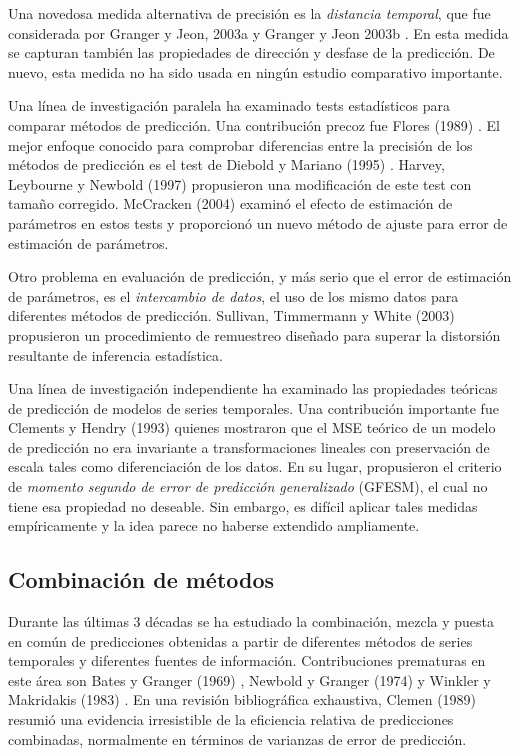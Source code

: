 \documentclass{llncs}
\begin{document}
Una novedosa medida alternativa de precisión es la \emph{distancia temporal}, que fue considerada por Granger y Jeon, 2003a \cite{Granger2003199} y Granger y Jeon 2003b \cite{Granger2003339}. En esta medida se capturan también  las propiedades de dirección y desfase de la predicción. De nuevo, esta medida no ha sido usada en ningún estudio comparativo importante.

Una línea de investigación paralela ha examinado tests estadísticos para comparar métodos de predicción. Una contribución precoz fue Flores (1989) \cite{Flores1989529}. El mejor enfoque conocido para comprobar diferencias entre la precisión de los métodos de predicción es el test de Diebold y Mariano (1995) \cite{Diebold1995253}. Harvey, Leybourne y Newbold (1997) \cite{Harvey1997281} propusieron una modificación de este test con tamaño corregido. McCracken (2004) \cite{McCracken2004503} examinó el efecto de estimación de parámetros en estos tests y proporcionó un nuevo método de ajuste para error de estimación de parámetros.

Otro problema en evaluación de predicción, y más serio que el error de estimación de parámetros, es el \emph{intercambio de datos}, el uso de los mismo datos para diferentes métodos de predicción. Sullivan, Timmermann y White (2003) \cite{Sullivan2003217} propusieron un procedimiento de remuestreo diseñado para superar la distorsión resultante de inferencia estadística.

Una línea de investigación independiente ha examinado las propiedades teóricas de predicción de modelos de series temporales. Una contribución importante fue Clements y Hendry (1993) \cite{Clements1993617} quienes mostraron que el MSE teórico de un modelo de predicción no era invariante a transformaciones lineales con preservación de escala tales como diferenciación de los datos. En su lugar, propusieron el criterio de \emph{momento segundo de error de predicción generalizado} (GFESM), el cual no tiene esa propiedad no deseable. Sin embargo, es difícil aplicar tales medidas empíricamente y la idea parece no haberse extendido ampliamente.

\subsection{Combinación de métodos}
Durante las últimas 3 décadas se ha estudiado la combinación, mezcla y puesta en común de predicciones obtenidas a partir de diferentes métodos de series temporales y diferentes fuentes de información. Contribuciones prematuras en este área son Bates y Granger (1969) \cite{BATESJM1969451}, Newbold y Granger (1974) \cite{Newbold1974131} y Winkler y Makridakis (1983) \cite{Winkler1983150}. En una revisión bibliográfica exhaustiva, Clemen (1989) \cite{Clemen1989559} resumió una evidencia irresistible de la eficiencia relativa de predicciones combinadas, normalmente en términos de varianzas de error de predicción.
\end{document}
